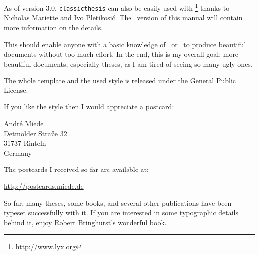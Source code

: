 As of version 3.0, \texttt{classicthesis} can also be easily used with 
\mLyX\footnote{\url{http://www.lyx.org}} thanks to Nicholas Mariette 
and Ivo Pletikosić. The \mLyX\ version of this manual will contain
more information on the details.

This should enable anyone with a basic knowledge of \LaTeXe\ or \mLyX\ to
produce beautiful documents without too much effort. In the end, this
is my overall goal: more beautiful documents, especially theses, as I
am tired of seeing so many ugly ones.

The whole template and the used style is released under the
 General Public License. 

If you like the style then I would appreciate a postcard:
\begin{center}
 André Miede \\
 Detmolder Straße 32 \\
 31737 Rinteln \\
 Germany
\end{center}
The postcards I received so far are available at:
\begin{center}
 \url{http://postcards.miede.de}
\end{center}
So far, many theses, some books, and several other publications have 
been typeset successfully with it. If you are interested in some
typographic details behind it, enjoy Robert Bringhurst's wonderful book.

